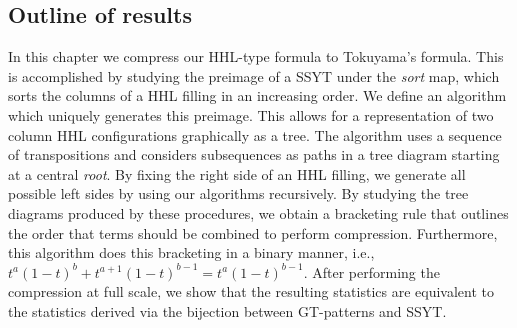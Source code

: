 \documentclass[11pt]{amsart}
\begin{document}
{\subsection{Outline of results}
In this chapter we compress our HHL-type formula to Tokuyama's formula. This is accomplished by studying the preimage of a SSYT under the \emph{sort} map, which sorts the columns of a HHL filling in an increasing order. We define an algorithm which uniquely generates this preimage. This allows for a representation of two column HHL configurations graphically as a tree. The algorithm uses a sequence of transpositions and considers subsequences as paths in a tree diagram starting at a central \emph{root}. By fixing the right side of an HHL filling, we generate all possible left sides by using our algorithms recursively. By studying the tree diagrams produced by these procedures, we obtain a bracketing rule that outlines the order that terms should be combined to perform compression. Furthermore, this algorithm does this bracketing in a binary manner, i.e., $t^{a}(1-t)^{b}+t^{a+1}(1-t)^{b-1}=t^{a}(1-t)^{b-1}$. After performing the compression at full scale, we show that the resulting statistics are equivalent to the statistics derived via the bijection between GT-patterns and SSYT. 








}
\end{document}
